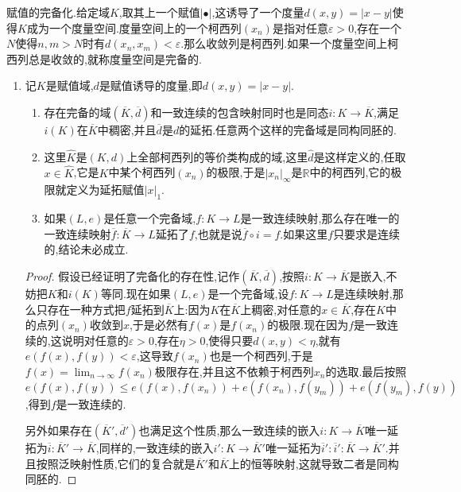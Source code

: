 赋值的完备化.给定域$K$,取其上一个赋值$|\bullet|$,这诱导了一个度量$d(x,y)=|x-y|$使得$K$成为一个度量空间.度量空间上的一个柯西列$(x_n)$是指对任意$\varepsilon>0$,存在一个$N$使得$n,m>N$时有$d(x_n,x_m)<\varepsilon$.那么收敛列是柯西列.如果一个度量空间上柯西列总是收敛的,就称度量空间是完备的.
\begin{enumerate}
	\item 记$K$是赋值域,$d$是赋值诱导的度量,即$d(x,y)=|x-y|$.
	\begin{enumerate}
		\item 存在完备的域$(\overline{K},\overline{d})$和一致连续的包含映射同时也是同态$i:K\to\overline{K}$,满足$i(K)$在$\overline{K}$中稠密,并且$\overline{d}$是$d$的延拓.任意两个这样的完备域是同构同胚的.
		\item 这里$\widehat{K}$是$(K,d)$上全部柯西列的等价类构成的域,这里$\widehat{d}$是这样定义的,任取$x\in\widehat{K}$,它是$K$中某个柯西列$(x_n)$的极限,于是$|x_n|_{\infty}$是$\mathbb{R}$中的柯西列,它的极限就定义为延拓赋值$|x|_1$.
		\item 如果$(L,e)$是任意一个完备域,$f:K\to L$是一致连续映射,那么存在唯一的一致连续映射$\overline{f}:\overline{K}\to L$延拓了$f$,也就是说$\overline{f}\circ i=f$.如果这里$f$只要求是连续的,结论未必成立.
	\end{enumerate}
	\begin{proof}
		
		假设已经证明了完备化的存在性,记作$(\overline{K},\overline{d})$,按照$i:K\to\overline{K}$是嵌入,不妨把$K$和$i(K)$等同.现在如果$(L,e)$是一个完备域,设$f:K\to L$是连续映射,那么只存在一种方式把$f$延拓到$\overline{K}$上:因为$K$在$\overline{K}$上稠密,对任意的$x\in\overline{K}$,存在$K$中的点列$(x_n)$收敛到$x$,于是必然有$f(x)$是$f(x_n)$的极限.现在因为$f$是一致连续的,这说明对任意的$\varepsilon>0$,存在$\eta>0$,使得只要$d(x,y)<\eta$,就有$e(f(x),f(y))<\varepsilon$,这导致$f(x_n)$也是一个柯西列,于是$f(x)=\lim_{n\to\infty}f(x_n)$极限存在,并且这不依赖于柯西列$x_n$的选取.最后按照$e(f(x),f(y))\le e(f(x),f(x_n))+e(f(x_n),f(y_m))+e(f(y_m),f(y))$,得到$f$是一致连续的.
		
		另外如果存在$(\overline{K}',\overline{d}')$也满足这个性质,那么一致连续的嵌入$i:K\to\overline{K}$唯一延拓为$\overline{i}:\overline{K}'\to\overline{K}$,同样的,一致连续的嵌入$i':K\to\overline{K}'$唯一延拓为$\overline{i}':\overline{i}':\overline{K}\to\overline{K}'$.并且按照泛映射性质,它们的复合就是$\overline{K}'$和$\overline{K}$上的恒等映射,这就导致二者是同构同胚的.
		

\end{proof}
\end{enumerate}
